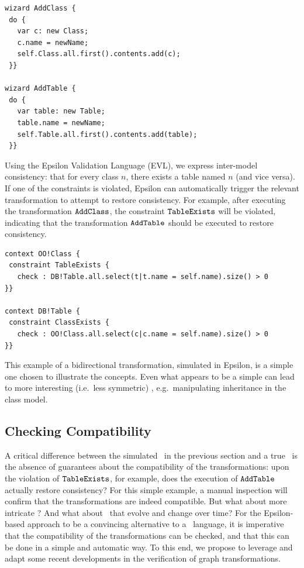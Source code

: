 	\begin{lstlisting}[float,floatplacement=H,basicstyle=\ttfamily,caption=Example wizards for simulating BX,captionpos=b,label=listing:wizards]
wizard AddClass {
 do {
   var c: new Class;
   c.name = newName;
   self.Class.all.first().contents.add(c);
 }}

wizard AddTable {
 do {
   var table: new Table;
   table.name = newName;
   self.Table.all.first().contents.add(table);
 }}
	\end{lstlisting}

Using the Epsilon Validation Language (EVL), we express inter-model consistency: that for every class $n$, there exists a table named $n$ (and vice versa). If one of the constraints is violated, Epsilon can automatically trigger the relevant transformation to attempt to restore consistency. For example, after executing the transformation $\tt AddClass$, the constraint $\tt TableExists$ will be violated, indicating that the transformation $\tt AddTable$ should be executed to restore consistency.
	
		\begin{lstlisting}[float,floatplacement=H,basicstyle=\ttfamily,caption=Inter-model constraints,captionpos=b,label=listing:constraints]
context OO!Class {
 constraint TableExists {
   check : DB!Table.all.select(t|t.name = self.name).size() > 0
}}	

context DB!Table {
 constraint ClassExists {
   check : OO!Class.all.select(c|c.name = self.name).size() > 0
}}
		\end{lstlisting}


This example of a bidirectional transformation,  simulated in Epsilon, is a simple one chosen to illustrate the concepts. Even what appears to be a simple \BX can lead to more interesting (i.e.\ less symmetric) \BX, e.g.\ manipulating inheritance in the class model.

\subsection{Checking Compatibility}
A critical difference between the simulated \BX\ in the previous section and a true \BX\ is the absence of guarantees about the compatibility of the transformations: upon the violation of $\tt TableExists$, for example, does the execution of $\tt AddTable$ actually restore consistency? For this simple example, a manual inspection will confirm that the transformations are indeed compatible. But what about more intricate \BX? And what about \BX\ that evolve and change over time? For the Epsilon-based approach to be a convincing alternative to a \BX\ language, it is imperative that the compatibility of the transformations can be checked, and that this can be done in a simple and automatic way. To this end, we propose to leverage and adapt some recent developments in the verification of graph transformations.
	
